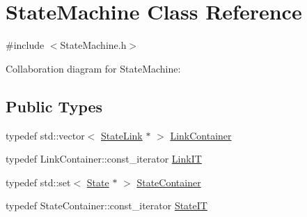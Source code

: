 \hypertarget{classStateMachine}{}\section{State\+Machine Class Reference}
\label{classStateMachine}


{\ttfamily \#include $<$State\+Machine.\+h$>$}



Collaboration diagram for State\+Machine\+:
\subsection*{Public Types}
\begin{DoxyCompactItemize}
\item 
typedef std\+::vector$<$ \hyperlink{classStateLink}{State\+Link} $\ast$ $>$ \hyperlink{classStateMachine_a48dd36fc36aca328a1d67f17a46bdbb1}{Link\+Container}
\item 
typedef Link\+Container\+::const\+\_\+iterator \hyperlink{classStateMachine_a918cb45a486130c0b513cfdbeed79fce}{Link\+IT}
\item 
typedef std\+::set$<$ \hyperlink{classState}{State} $\ast$ $>$ \hyperlink{classStateMachine_aa74dc6c024af439e701f6d97cfa4c8b8}{State\+Container}
\item 
typedef State\+Container\+::const\+\_\+iterator \hyperlink{classStateMachine_ad01ce4c7148b88eee35e0598f0f3ce22}{State\+IT}
\end{DoxyCompactItemize}
